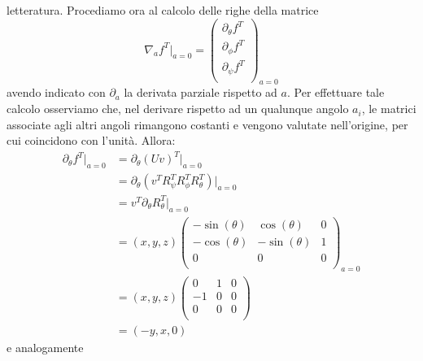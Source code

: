 \documentclass[fleqn,italian]{article}
\theoremstyle{definition}
\theoremstyle{remark}
\theoremstyle{plain}%
\theoremstyle{definition}
\theoremstyle{remark}
\numberwithin{equation}{section}
\numberwithin{thm}{section}
\begin{document}
letteratura.
Procediamo ora al calcolo delle righe della matrice
\begin{equation}
\nabla_a f^T\vert_{a=0}=\begin{pmatrix} \partial_\theta f^T \\
                             \partial_\phi f^T \\
                             \partial_\psi f^T \\
             \end{pmatrix}_{a=0}
\end{equation}
avendo indicato con $\partial_a$ la derivata parziale rispetto ad $a$. Per
effettuare tale calcolo osserviamo che, nel derivare rispetto ad un 
qualunque angolo $a_i$, le matrici associate agli altri angoli rimangono 
costanti e vengono valutate nell'origine, per cui coincidono con l'unit\`a. 
Allora:
\begin{equation}
\begin{split}
\partial_\theta f^T\vert_{a=0} &=\partial_\theta(Uv)^T\vert_{a=0} \\
          &= \partial_\theta(v^T R_\psi^T R_\phi^T R_\theta^T)\vert_{a=0} \\
          &= v^T \partial_\theta R_\theta^T\vert_{a=0} \\
          &= (x,y,z) \begin{pmatrix}  
                          -\sin(\theta) & \cos(\theta) & 0 \\
                          -\cos(\theta) & -\sin(\theta) & 1 \\
                           0 & 0 & 0 \\ \end{pmatrix}_{a=0} \\
          &= (x,y,z) \begin{pmatrix} 
                          0 & 1 & 0 \\-1 & 0 & 0 \\ 0 & 0 & 0 \\
                          \end{pmatrix} \\
          &= (-y,x,0)
\end{split}
\end{equation}
e analogamente
\end{document}
